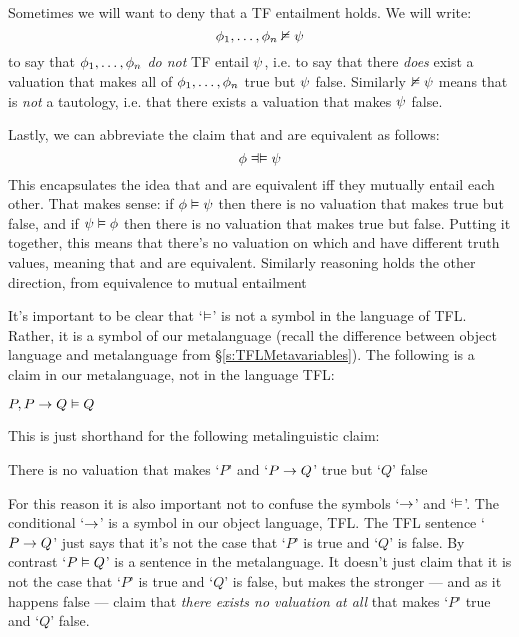 Sometimes we will want to deny that a TF entailment holds.  We will write:
$$\mathcal{\phi}_1, \ldots, \mathcal{\phi}_n \nvDash\mathcal{\psi}$$
to say that $\mathcal{\phi}_1, \ldots, \mathcal{\phi}_n$ \emph{do not} TF entail $\mathcal{\psi}$, i.e. to say that there \emph{does} exist a valuation that makes all of $\mathcal{\phi}_1, \ldots, \mathcal{\phi}_n$ true but $\mathcal{\psi}$ false. Similarly $\nvDash \mathcal{\psi}$ means that \meta{\psi} is \emph{not} a tautology, i.e. that there exists a valuation that makes $\mathcal{\psi}$ false.

Lastly, we can abbreviate the claim that \meta{\phi} and \meta{\psi} are equivalent as follows:
$$\meta{\phi} \lequiv \meta{\psi}$$
This encapsulates the idea that \meta{\phi} and \meta{\psi} are equivalent iff they mutually entail each other.  That makes sense: if $\mathcal{\phi} \vDash \mathcal{\psi}$ then there is no valuation that makes \meta{\phi} true but \meta{\psi} false, and if $\mathcal{\psi} \vDash \mathcal{\phi}$ then there is no valuation that makes \meta{\psi} true but \meta{\phi} false.  Putting it together, this means that there's no valuation on which \meta{\phi} and \meta{\psi} have different truth values, meaning that \meta{\phi} and \meta{\psi} are equivalent.  Similarly reasoning holds the other direction, from equivalence to mutual entailment


It's important to be clear that `$\vDash$' is not a symbol in the language of TFL. Rather, it is a symbol of our metalanguage (recall the difference between object language and metalanguage from \S\ref{s:TFLMetavariables}). The following is a claim in our metalanguage, not in the language TFL:
	\begin{ebullet}
		\item $P, P \rightarrow Q \vDash Q$
	\end{ebullet}
This is just shorthand for the following metalinguistic claim:
	\begin{ebullet}
		\item There is no valuation that makes `$P$' and `$P \rightarrow Q$' true but `$Q$' false
	\end{ebullet}

For this reason it is also important not to confuse the symbols `$\rightarrow$' and `$\vDash$'. The conditional `$\rightarrow$' is a symbol in our object language, TFL.  The TFL sentence `$P \rightarrow Q$' just says that it's not the case that `$P$' is true and `$Q$' is false.  By contrast `$P \vDash Q$' is a sentence in the metalanguage.  It doesn't just claim that it is not the case that `$P$' is true and `$Q$' is false, but makes the stronger --- and as it happens false --- claim that \emph{there exists no valuation at all} that makes `$P$' true and `$Q$' false.


